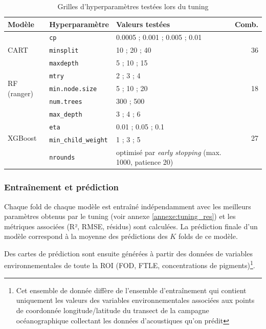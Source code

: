 \documentclass[11pt,a4paper,oneside]{report}
\begin{document}
	\begin{table}[htbp]
		\centering
		\caption{Grilles d'hyperparamètres testées lors du tuning}
		\label{tab:tuning_grids}
		\begin{tabularx}{\textwidth}{l l X r}
			\toprule
			Modèle & Hyperparamètre & Valeurs testées & Comb. \\
			\midrule
			\multirow{3}{*}{CART}
			& \texttt{cp}        & 0.0005 ; 0.001 ; 0.005 ; 0.01 & \multirow{3}{*}{36} \\
			& \texttt{minsplit}  & 10 ; 20 ; 40                  & \\
			& \texttt{maxdepth}  & 5 ; 10 ; 15                   & \\
			\midrule
			\multirow{3}{*}{RF (ranger)}
			& \texttt{mtry}           & 2 ; 3 ; 4      & \multirow{3}{*}{18} \\
			& \texttt{min.node.size}  & 5 ; 10 ; 20    & \\
			& \texttt{num.trees}      & 300 ; 500      & \\
			\midrule
			\multirow{4}{*}{XGBoost}
			& \texttt{max\_depth}         & 3 ; 4 ; 6          & \multirow{4}{*}{27} \\
			& \texttt{eta}                & 0.01 ; 0.05 ; 0.1  & \\
			& \texttt{min\_child\_weight} & 1 ; 3 ; 5           & \\
			& \texttt{nrounds}            & optimisé par \emph{early stopping} (max. 1000, patience 20) & \\
			\bottomrule
		\end{tabularx}
	\end{table}
	
	\subsubsection{Entraînement et prédiction}
	Chaque fold de chaque modèle est entraîné indépendamment avec les meilleurs paramètres obtenus par le tuning (voir annexe \ref{annexe:tuning_res}) et les métriques associées (R², RMSE, résidus) sont calculées. La prédiction finale d'un modèle correspond à la moyenne des prédictions des $K$ folds de ce modèle.
	
	Des cartes de prédiction sont ensuite générées à partir des données de variables environnementales de toute la ROI (FOD, FTLE, concentrations de pigments)\footnote{Cet ensemble de donnée diffère de l'ensemble d'entraînement qui contient uniquement les valeurs des variables environnementales associées aux points de coordonnée longitude/latitude du transect de la campagne océanographique collectant les données d'acoustiques qu'on prédit}. 
	
\end{document}

